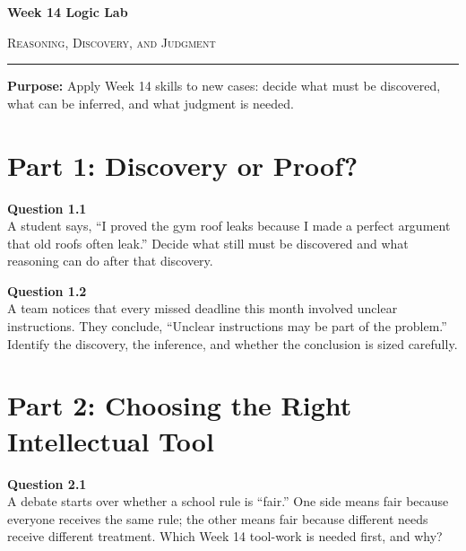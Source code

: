 \documentclass[12pt]{article}
\begin{document}
\begin{center}
{\LARGE\bfseries Week 14 Logic Lab}\par\vspace{0.05em}
{\large\scshape Reasoning, Discovery, and Judgment}\par\vspace{0.1em}
\rule{0.78\textwidth}{0.5pt}\par\vspace{0.15em}
\end{center}

\noindent\textbf{Purpose:} Apply Week 14 skills to new cases: decide what must be discovered, what can be inferred, and what judgment is needed.

\vspace{0.3em}

\section*{Part 1: Discovery or Proof?}

\textbf{Question 1.1}\\[-0.15em]
A student says, ``I proved the gym roof leaks because I made a perfect argument that old roofs often leak.'' Decide what still must be discovered and what reasoning can do after that discovery.


\textbf{Question 1.2}\\[-0.15em]
A team notices that every missed deadline this month involved unclear instructions. They conclude, ``Unclear instructions may be part of the problem.'' Identify the discovery, the inference, and whether the conclusion is sized carefully.


\newpage

\section*{Part 2: Choosing the Right Intellectual Tool}

\textbf{Question 2.1}\\[-0.15em]
A debate starts over whether a school rule is ``fair.'' One side means fair because everyone receives the same rule; the other means fair because different needs receive different treatment. Which Week 14 tool-work is needed first, and why?

\end{document}
